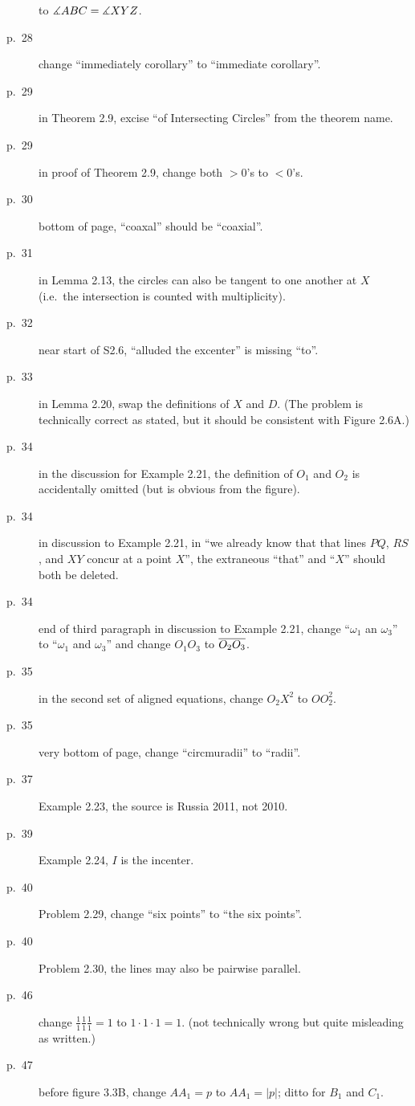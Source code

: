 \documentclass[11pt]{scrartcl}
\begin{document}
\begin{description}
  to $\measuredangle ABC = \measuredangle XYZ$.
\item[p.\  28] change ``immediately corollary'' to ``immediate corollary''.
\item[p.\  29] in Theorem 2.9, excise ``of Intersecting Circles'' from the theorem name.
\item[p.\  29] in proof of Theorem 2.9, change both $>0$'s to $<0$'s.
\item[p.\  30] bottom of page, ``coaxal'' should be ``coaxial''.
\item[p.\  31] in Lemma 2.13, the circles can also be tangent
  to one another at $X$ (i.e.\ the intersection is counted with multiplicity).
\item[p.\  32] near start of S2.6, ``alluded the excenter'' is missing ``to''.
\item[p.\  33] in Lemma 2.20, swap the definitions of $X$ and $D$.
  (The problem is technically correct as stated,
  but it should be consistent with Figure 2.6A.)
\item[p.\  34] in the discussion for Example 2.21,
  the definition of $O_1$ and $O_2$ is accidentally omitted (but is obvious from the figure).
\item[p.\  34] in discussion to Example 2.21, in
  ``we already know that that lines $PQ$, $RS$, and $XY$ concur at a point $X$'',
  the extraneous ``that'' and ``$X$'' should both be deleted.
\item[p.\  34] end of third paragraph in discussion to Example 2.21,
  change ``$\omega_1$ an $\omega_3$'' to ``$\omega_1$ and $\omega_3$''
  and change $O_1O_3$ to $\overline{O_2O_3}$.
\item[p.\  35] in the second set of aligned equations,
  change $O_2X^2$ to $OO_2^2$.
\item[p.\  35] very bottom of page, change ``circmuradii'' to ``radii''.
\item[p.\  37] Example 2.23, the source is Russia 2011, not 2010.
\item[p.\  39] Example 2.24, $I$ is the incenter.
\item[p.\  40] Problem 2.29, change ``six points'' to ``the six points''.
\item[p.\  40] Problem 2.30, the lines may also be pairwise parallel.
\item[p.\  46] change $\frac 11 \frac 11 \frac 11 = 1$ to $1 \cdot 1 \cdot 1 = 1$.
  (not technically wrong but quite misleading as written.)
\item[p.\  47] before figure 3.3B, change $AA_1=p$ to $AA_1=|p|$; ditto for $B_1$ and $C_1$.

\end{description}
\end{document}
